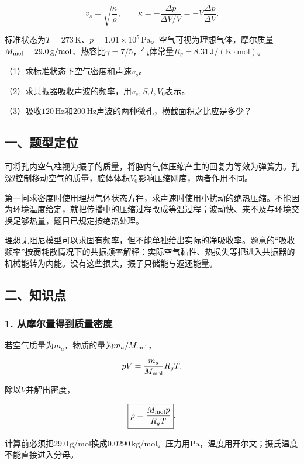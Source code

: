 \documentclass[12pt,a4paper,fontset=fandol]{ctexart}
\begin{document}
\[
v_s=\sqrt{\frac{\kappa}{\rho}},
\qquad
\kappa=-\frac{\Delta p}{\Delta V/V}
=-V\frac{\Delta p}{\Delta V}.
\]

标准状态为\(T=273\,\mathrm K\)、\(p=1.01\times10^5\,\mathrm{Pa}\)。空气可视为理想气体，摩尔质量\(M_{\rm mol}=29.0\,\mathrm{g/mol}\)、热容比\(\gamma=7/5\)，气体常量\(R_g=8.31\,\mathrm{J/(K\cdot mol)}\)。

（1）求标准状态下空气密度和声速\(v_s\)。

（2）求共振器吸收声波的频率，用\(v_s,S,l,V_0\)表示。

（3）吸收\(120\,\mathrm{Hz}\)和\(200\,\mathrm{Hz}\)声波的两种微孔，横截面积之比应是多少？

\subsection{一、题型定位}\label{ux4e00ux9898ux578bux5b9aux4f4d-3}

可将孔内空气柱视为振子的质量，将腔内气体压缩产生的回复力等效为弹簧力。孔深\(l\)控制移动空气的质量，腔体体积\(V_0\)影响压缩刚度，两者作用不同。

第一问求密度时使用理想气体状态方程，求声速时使用小扰动的绝热压缩。不能因为环境温度给定，就把传播中的压缩过程改成等温过程；波动快、来不及与环境交换足够热量，题目已规定按绝热处理。

理想无阻尼模型可以求固有频率，但不能单独给出实际的净吸收率。题意的``吸收频率''按弱耗散情况下的共振频率解释：实际空气黏性、热损失等把进入共振器的机械能转为内能。没有这些损失，振子只储能与返还能量。

\subsection{二、知识点}\label{ux4e8cux77e5ux8bc6ux70b9-3}

\subsubsection{1.
从摩尔量得到质量密度}\label{ux4eceux6469ux5c14ux91cfux5f97ux5230ux8d28ux91cfux5bc6ux5ea6}

若空气质量为\(m_a\)，物质的量为\(m_a/M_{\rm mol}\)，

\[
pV=\frac{m_a}{M_{\rm mol}}R_gT.
\]

除以\(V\)并解出密度，

\[
\boxed{\rho=\frac{M_{\rm mol}p}{R_gT}}.
\]

计算前必须把\(29.0\,\mathrm{g/mol}\)换成\(0.0290\,\mathrm{kg/mol}\)。压力用\(\mathrm{Pa}\)，温度用开尔文；摄氏温度不能直接进入分母。
\end{document}
